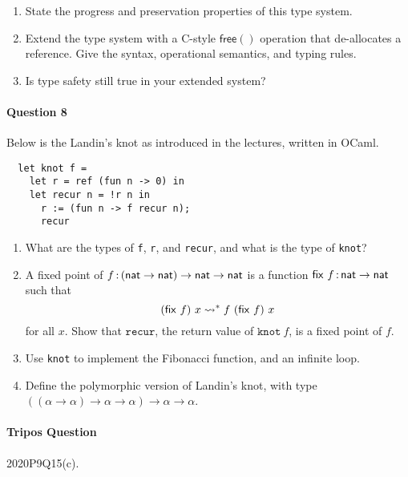 \documentclass[11pt,a4paper,twoside]{article}
\begin{document}
 \begin{enumerate}[label=(\alph*)]
  \item State the progress and preservation properties of this type system.

  \item Extend the type system with a C-style $\mathsf{free()}$ operation
  that de-allocates a reference. 
  Give the syntax, operational semantics, and typing rules.

  \item Is type safety still true in your extended system? 
\end{enumerate} 

\paragraph{Question 8} Below is the Landin's knot as introduced in the lectures, written in OCaml.
\begin{lstlisting}
  let knot f =
    let r = ref (fun n -> 0) in
    let recur n = !r n in
      r := (fun n -> f recur n);
      recur
\end{lstlisting}

\vspace{-1em}

\begin{enumerate}[label=(\alph*)]
  \item What are the types of \texttt{f}, \texttt{r}, and \texttt{recur},
  and what is the type of \texttt{knot}?

  \item A fixed point of $f \,{:}\, (\mathsf{nat} \to \mathsf{nat}) \to \mathsf{nat} \to \mathsf{nat}$
    is a function $\mathsf{fix}\ f \,{:}\, \mathsf{nat} \to \mathsf{nat}$ such that
    \[ (\mathsf{fix}\ f)\ x \reduces f\ (\mathsf{fix}\ f)\ x\]
  for all $x$. 
  Show that $\texttt{recur}$, the return value of $\texttt{knot}\ f$,
  is a fixed point of $f$.

  \item Use \texttt{knot} to implement the Fibonacci function, and an infinite loop.

  \item Define the polymorphic version of Landin's knot, with type  
  $((\alpha \to \alpha) \to \alpha \to \alpha) \to \alpha \to \alpha$.
\end{enumerate} 

\paragraph{Tripos Question} 2020P9Q15(c).
\end{document}
